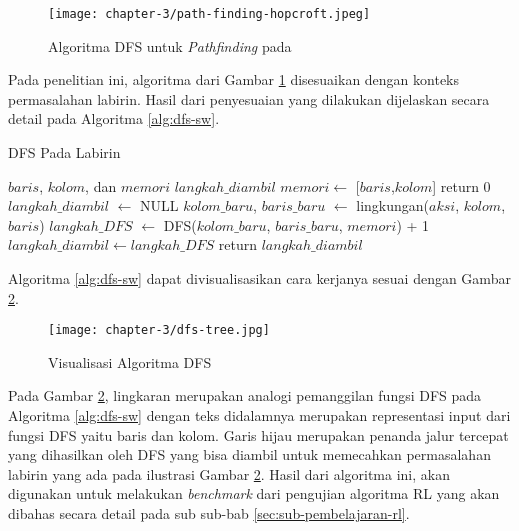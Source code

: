 \begin{figure}[H]
	\centering
	\texttt{[image: chapter-3/path-finding-hopcroft.jpeg]}
	\caption{Algoritma \ac{DFS} untuk \textit{Pathfinding} pada \parencite{hopcroft1973algorithm}}
	\label{fig:hopcroft-dfs}
\end{figure}

Pada penelitian ini, algoritma dari Gambar \ref{fig:hopcroft-dfs} disesuaikan dengan konteks permasalahan labirin. Hasil dari penyesuaian yang dilakukan dijelaskan secara detail pada Algoritma \ref{alg:dfs-sw}.

\begin{algorithm}
	\makeatletter
	\renewcommand{\ALG@name}{Algoritma}
	\makeatother
	\caption{\ac{DFS} Pada Labirin}\label{alg:dfs-sw}
	\renewcommand{\algorithmicrequire}{\textbf{Masukan:}}
	\renewcommand{\algorithmicensure}{\textbf{Keluaran:}}
	\begin{algorithmic}[1]
		\Require $baris$, $kolom$, dan $memori$
		\Ensure $langkah\_diambil$
		\State $memori \gets$ [$baris$,$kolom$]
		\State return 0 \EndIf
		\State $langkah\_diambil$ $\gets$ NULL
		\State $kolom\_baru$, $baris\_baru$ $\gets$ lingkungan($aksi$, $kolom$, $baris$)
		\State $langkah\_DFS$ $\gets$ DFS($kolom\_baru$, $baris\_baru$, $memori$) + 1
		\State $langkah\_diambil \gets langkah\_DFS$
		\EndIf
		\EndIf
		\EndFor
		\State return $langkah\_diambil$
	\end{algorithmic}
\end{algorithm}

Algoritma \ref{alg:dfs-sw} dapat divisualisasikan cara kerjanya sesuai dengan Gambar \ref{fig:dfs-visualization}.

\begin{figure}[H]
	\centering
	\texttt{[image: chapter-3/dfs-tree.jpg]}
	\caption{Visualisasi Algoritma \ac{DFS}}
	\label{fig:dfs-visualization}
\end{figure}

Pada Gambar \ref{fig:dfs-visualization}, lingkaran merupakan analogi pemanggilan fungsi \ac{DFS} pada Algoritma \ref{alg:dfs-sw} dengan teks didalamnya merupakan representasi input dari fungsi \ac{DFS} yaitu baris dan kolom. Garis hijau merupakan penanda jalur tercepat yang dihasilkan oleh DFS yang bisa diambil untuk memecahkan permasalahan labirin yang ada pada ilustrasi Gambar \ref{fig:dfs-visualization}. Hasil dari algoritma ini, akan digunakan untuk melakukan \textit{benchmark} dari pengujian algoritma \ac{RL} yang akan dibahas secara detail pada sub sub-bab \ref{sec:sub-pembelajaran-rl}.

